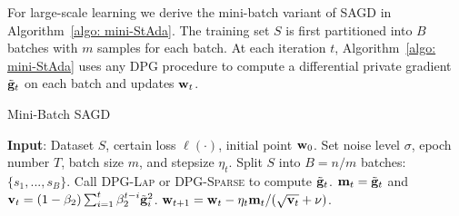 \documentclass[11pt]{article}
\begin{document}
For large-scale learning we derive the mini-batch variant of \textsc{SAGD} in Algorithm~\ref{algo: mini-StAda}. 
The training set $S$ is first partitioned into $B$ batches with $m$ samples for each batch. 
At each iteration $t$, Algorithm~\ref{algo: mini-StAda} uses any \textsc{DPG} procedure to compute a differential private gradient $\tilde {\mathbf{g}}_t$ on each batch and updates $\mathbf{w}_t$. 
\begin{algorithm}[H]
\caption{Mini-Batch \textsc{SAGD}}
\begin{algorithmic}[1] \label{algo: mini-StAda}
\STATE \textbf{Input}: Dataset $S$,  certain loss $\ell(\cdot)$, initial point $\mathbf{w}_0$.
\STATE Set noise level $\sigma$, epoch number $T$,  batch size $m$, and stepsize $\eta_t$.
\STATE Split $S$ into $B=n/m$ batches: $\{ s_1,..., s_B\}$.
\STATE \label{line:dpgmini} Call \textsc{DPG-Lap} or \textsc{DPG-Sparse} to compute $\tilde {\mathbf{g}}_t$.
\STATE \label{line:mini1} $\mathbf{m}_t = \tilde {\mathbf{g}}_t$ and $\mathbf{v}_t = \left(1-\beta_{2}\right) \sum_{i=1}^{t} \beta_{2}^{t-i} \tilde {\mathbf{g}}_{i}^{2}$.
\STATE \label{line:mini2} $\mathbf{w}_{t+1}=\mathbf{w}_{t}-\eta_t \mathbf{m}_t /(\sqrt{\mathbf{v}_t}+\nu)$.
\ENDFOR
\ENDFOR 
\end{algorithmic}
\end{algorithm} 
\end{document}
